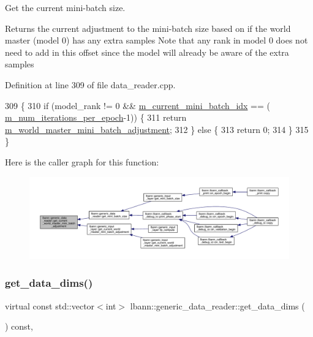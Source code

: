 Get the current mini-\/batch size. 

Returns the current adjustment to the mini-\/batch size based on if the world master (model 0) has any extra samples Note that any rank in model 0 does not need to add in this offset since the model will already be aware of the extra samples 

Definition at line 309 of file data\+\_\+reader.\+cpp.


\begin{DoxyCode}
309                                                                                             \{
310   \textcolor{keywordflow}{if} (model\_rank != 0 && \hyperlink{classlbann_1_1generic__data__reader_aefd4bc0bf95de1e2500827581acf3536}{m\_current\_mini\_batch\_idx} == (
      \hyperlink{classlbann_1_1generic__data__reader_ab570063483a1f604ca2fc536c3d83de7}{m\_num\_iterations\_per\_epoch}-1)) \{
311     \textcolor{keywordflow}{return} \hyperlink{classlbann_1_1generic__data__reader_acd33b2dbdfd4043ecc62cc13789532a2}{m\_world\_master\_mini\_batch\_adjustment};
312   \} \textcolor{keywordflow}{else} \{
313     \textcolor{keywordflow}{return} 0;
314   \}
315 \}
\end{DoxyCode}
Here is the caller graph for this function\+:\nopagebreak
\begin{figure}[H]
\begin{center}
\leavevmode
\includegraphics[width=350pt]{classlbann_1_1generic__data__reader_af80711baa226f8bc370e8e276c49f3c1_icgraph}
\end{center}
\end{figure}
\mbox{\label{classlbann_1_1generic__data__reader_ae06ff27459ac4a5d8ac14655d4b31318}} 
\subsubsection{\texorpdfstring{get\+\_\+data\+\_\+dims()}{get\_data\_dims()}}
{\footnotesize\ttfamily virtual const std\+::vector$<$int$>$ lbann\+::generic\+\_\+data\+\_\+reader\+::get\+\_\+data\+\_\+dims (\begin{DoxyParamCaption}{ }\end{DoxyParamCaption}) const\hspace{0.3cm}{\ttfamily [inline]}, {\ttfamily [virtual]}}



